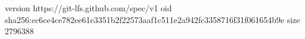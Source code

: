 version https://git-lfs.github.com/spec/v1
oid sha256:ec6ce4ce782ee61e3351b2f22573aaf1c511e2a942fc3358716f31f061654b9e
size 2796388
